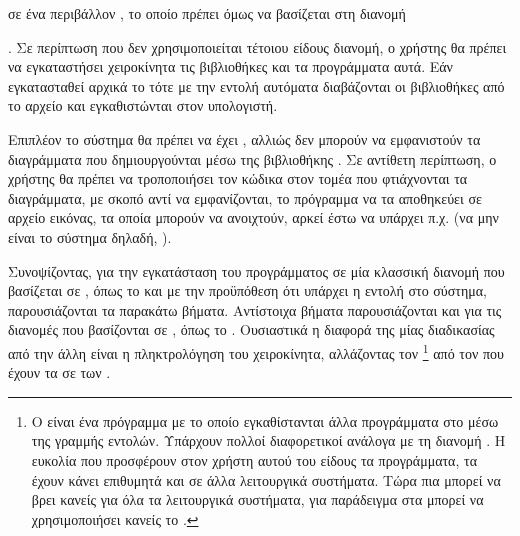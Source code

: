 \documentclass[12pt]{report}
\begin{document}
σε ένα περιβάλλον {}, το οποίο πρέπει όμως να βασίζεται στη διανομή {{}. Σε περίπτωση που δεν χρησιμοποιείται τέτοιου είδους διανομή, ο χρήστης θα πρέπει να εγκαταστήσει χειροκίνητα τις βιβλιοθήκες και τα προγράμματα αυτά. 
Εάν εγκατασταθεί αρχικά το {} τότε με την εντολή {} αυτόματα διαβάζονται οι βιβλιοθήκες από το αρχείο και εγκαθιστώνται στον υπολογιστή.

{}

Επιπλέον το σύστημα θα πρέπει να έχει {}, αλλιώς δεν μπορούν να εμφανιστούν τα διαγράμματα που δημιουργούνται μέσω της βιβλιοθήκης {}.
Σε αντίθετη περίπτωση, ο χρήστης θα πρέπει να τροποποιήσει τον κώδικα στον τομέα που φτιάχνονται τα διαγράμματα, με σκοπό αντί να εμφανίζονται, το πρόγραμμα να τα αποθηκεύει σε αρχείο εικόνας, τα οποία μπορούν
να ανοιχτούν, αρκεί έστω να υπάρχει {} π.χ. {} (να μην είναι το σύστημα δηλαδή, {}).

Συνοψίζοντας, για την εγκατάσταση του προγράμματος σε μία κλασσική διανομή που βασίζεται σε {}, όπως το {} και με την προϋπόθεση ότι υπάρχει η εντολή {} στο σύστημα, παρουσιάζονται
τα παρακάτω βήματα. Αντίστοιχα βήματα παρουσιάζονται και για τις διανομές που βασίζονται σε {}, όπως το {}. Ουσιαστικά η διαφορά της μίας διαδικασίας από την άλλη 
είναι η πληκτρολόγηση του {} χειροκίνητα, αλλάζοντας τον {}\footnote{Ο {} είναι ένα πρόγραμμα με το οποίο εγκαθίστανται άλλα προγράμματα στο 
{} μέσω της γραμμής εντολών. Υπάρχουν πολλοί διαφορετικοί {} ανάλογα με τη διανομή {}. Η ευκολία που προσφέρουν στον χρήστη αυτού του είδους τα προγράμματα, τα έχουν κάνει επιθυμητά και σε άλλα λειτουργικά συστήματα. Τώρα πια μπορεί να βρει κανείς {} για όλα τα λειτουργικά συστήματα, για παράδειγμα στα {} μπορεί να χρησιμοποιήσει κανείς το 
{}.} από τον {} που έχουν τα {} σε {} των {}. 

}
\end{document}
